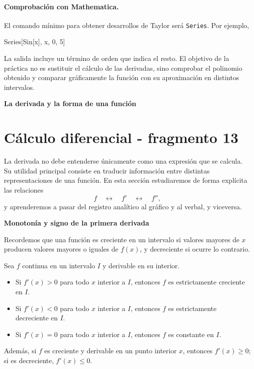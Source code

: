 \paragraph{Comprobación con Mathematica.}
El comando mínimo para obtener desarrollos de Taylor será \texttt{Series}. Por ejemplo,
\begin{mathematicacode}
Series[Sin[x], {x, 0, 5}]
\end{mathematicacode}
La salida incluye un término de orden que indica el resto. El objetivo de la práctica no es sustituir el cálculo de las derivadas, sino comprobar el polinomio obtenido y comparar gráficamente la función con su aproximación en distintos intervalos.

\textbf{La derivada y la forma de una función}


\section{Cálculo diferencial - fragmento 13}
La derivada no debe entenderse únicamente como una expresión que se calcula. Su utilidad principal consiste en traducir información entre distintas representaciones de una función. En esta sección estudiaremos de forma explícita las relaciones
\[
f\quad\longleftrightarrow\quad f'\quad\longleftrightarrow\quad f'',
\]
y aprenderemos a pasar del registro analítico al gráfico y al verbal, y viceversa.

\textbf{Monotonía y signo de la primera derivada}

Recordemos que una función es creciente en un intervalo si valores mayores de $x$ producen valores mayores o iguales de $f(x)$, y decreciente si ocurre lo contrario.

\begin{theorem}
Sea $f$ continua en un intervalo $I$ y derivable en su interior.
\begin{itemize}
\item Si $f'(x)>0$ para todo $x$ interior a $I$, entonces $f$ es estrictamente creciente en $I$.
\item Si $f'(x)<0$ para todo $x$ interior a $I$, entonces $f$ es estrictamente decreciente en $I$.
\item Si $f'(x)=0$ para todo $x$ interior a $I$, entonces $f$ es constante en $I$.
\end{itemize}
Además, si $f$ es creciente y derivable en un punto interior $x$, entonces $f'(x)\geq0$; si es decreciente, $f'(x)\leq0$.
\end{theorem}

